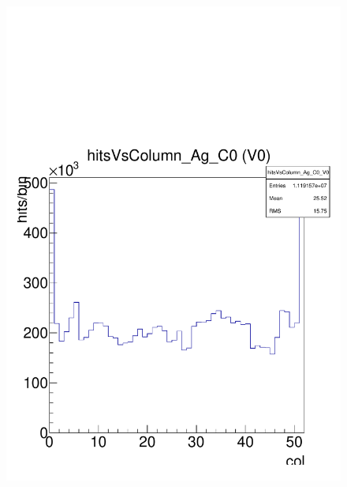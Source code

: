 \documentclass[a4paper,12pt,twoside]{article}
\begin{document}
\begin{figure} [h!]
\centering
\begin{minipage}{.48\textwidth}
  \centering
  \includegraphics[width=\textwidth]{./Figures/HRData_HitsColumn.pdf}
  \label{HRData-HitsColumn}
\end{minipage}%
\hspace{2mm}
\begin{minipage}{.48\textwidth}
  \centering

\end{minipage}
\end{figure}
\end{document}
